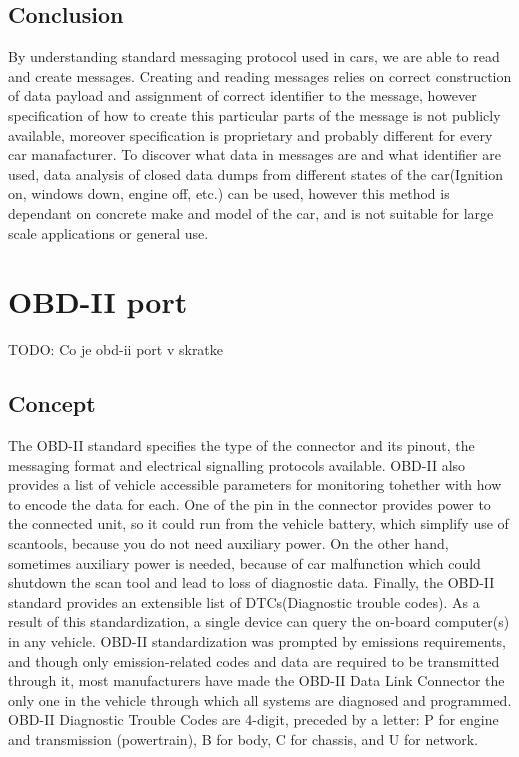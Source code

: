 \subsection{Conclusion} %
\label{sub:conclusion}
By understanding standard messaging protocol used in cars, we are able to read and create messages. Creating and reading messages relies on correct construction of data payload and assignment of correct identifier to the message, however specification of how to create this particular parts of the message is not publicly available, moreover specification is proprietary and probably different for every car manafacturer. To discover what data in messages are and what identifier are used, data analysis of closed data dumps from different states of the car(Ignition on, windows down, engine off, etc.) can be used, however this method is dependant on concrete make and model of the car, and is not suitable for large scale applications or general use.
\section{OBD-II port}
TODO: Co je obd-ii port v skratke
\subsection{Concept}
The OBD-II standard specifies the type of the connector and its pinout, the messaging format and electrical signalling protocols available. OBD-II also provides a list of vehicle accessible parameters for monitoring tohether with how to encode the data for each. One of the pin in the connector provides power to the connected unit, so it could run from the vehicle battery, which simplify use of scantools, because you do not need auxiliary power. On the other hand, sometimes auxiliary power is needed, because of car malfunction which could shutdown the scan tool and lead to loss of diagnostic data. Finally, the OBD-II standard provides an extensible list of DTCs(Diagnostic trouble codes). As a result of this standardization, a single device can query the on-board computer(s) in any vehicle. OBD-II standardization was prompted by emissions requirements, and though only emission-related codes and data are required to be transmitted through it, most manufacturers have made the OBD-II Data Link Connector the only one in the vehicle through which all systems are diagnosed and programmed. OBD-II Diagnostic Trouble Codes are 4-digit, preceded by a letter: P for engine and transmission (powertrain), B for body, C for chassis, and U for network. \cite{obdiso}
